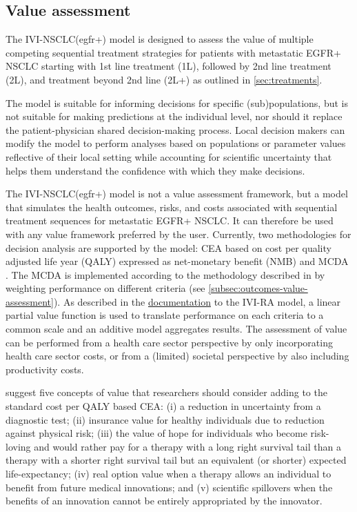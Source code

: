 \documentclass[11pt,final,fleqn]{article}\usepackage[]{graphicx}\usepackage[]{color}
\theoremstyle{plain}
\begin{document}
{\subsection{Value assessment}
The IVI-NSCLC(egfr+) model is designed to assess the value of multiple competing sequential treatment strategies for patients with metastatic EGFR+ NSCLC starting with 1st line treatment (1L), followed by 2nd line treatment (2L), and treatment beyond 2nd line (2L+) as outlined in \autoref{sec:treatments}.

The model is suitable for informing decisions for specific (sub)populations, but is not suitable for making predictions at the individual level, nor should it replace the patient-physician shared decision-making process. Local decision makers can modify the model to perform analyses based on populations or parameter values reflective of their local setting while accounting for scientific uncertainty that helps them understand the confidence with which they make decisions. 
 
The IVI-NSCLC(egfr+) model is not a value assessment framework, but a model that simulates the health outcomes, risks, and costs associated with sequential treatment sequences for metastatic EGFR+ NSCLC. It can therefore be used with any value framework preferred by the user. Currently, two methodologies for decision analysis are supported by the model: CEA based on cost per quality adjusted life year (QALY) expressed as net-monetary benefit (NMB) and MCDA \citep{keeney1993decisions}. The MCDA is implemented according to the methodology described in \citet{thokala2016multiple} by weighting performance on different criteria (see \autoref{subsec:outcomes-value-assessment}). As described in the \href{https://innovationvalueinitiative.github.io/IVI-RA/model-description/model-description.pdf}{documentation} to the IVI-RA model, a linear partial value function is used to translate performance on each criteria to a common scale and an additive model aggregates results. The assessment of value can be performed from a health care sector perspective by only incorporating health care sector costs, or from a (limited) societal perspective by also including productivity costs.

\citet{garrison2017toward} suggest five concepts of value that researchers should consider adding to the standard cost per QALY based CEA: (i) a reduction in uncertainty from a diagnostic test; (ii) insurance value for healthy individuals due to reduction against physical risk; (iii) the value of hope for individuals who become risk-loving and would rather pay for a therapy with a long right survival tail than a therapy with a shorter right survival tail but an equivalent (or shorter) expected life-expectancy; (iv) real option value when a therapy allows an individual to benefit from future medical innovations; and (v) scientific spillovers when the benefits of an innovation cannot be entirely appropriated by the innovator.

}
\end{document}
